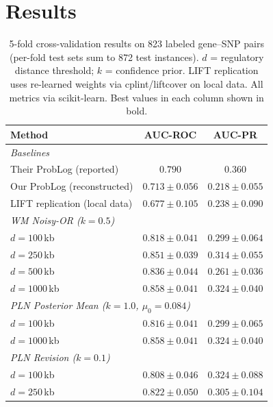\documentclass[]{article}
\begin{document}
\section{Results}
\label{sec:results}

\begin{table}[t]
\centering
\caption{5-fold cross-validation results on 823 labeled gene--SNP pairs
  (per-fold test sets sum to 872 test instances).
  $d$ = regulatory distance threshold; $k$ = confidence prior.
  LIFT replication uses re-learned weights via cplint/liftcover on local data.
  All metrics via scikit-learn.  Best values in each column shown in bold.}
\label{tab:results}
\begin{tabular}{@{}lcc@{}}
\toprule
\textbf{Method} & \textbf{AUC-ROC} & \textbf{AUC-PR} \\
\midrule
\multicolumn{3}{l}{\emph{Baselines}} \\
Their ProbLog (reported) & $0.790$ & $0.360$ \\
Our ProbLog (reconstructed) & $0.713 \pm 0.056$ & $0.218 \pm 0.055$ \\
LIFT replication (local data) & $0.677 \pm 0.105$ & $0.238 \pm 0.090$ \\
\midrule
\multicolumn{3}{l}{\emph{WM Noisy-OR ($k = 0.5$)}} \\
\quad $d = 100$\,kb & $0.818 \pm 0.041$ & $0.299 \pm 0.064$ \\
\quad $d = 250$\,kb & $0.851 \pm 0.039$ & $0.314 \pm 0.055$ \\
\quad $d = 500$\,kb & $0.836 \pm 0.044$ & $0.261 \pm 0.036$ \\
\quad $d = 1000$\,kb & $\mathbf{0.858 \pm 0.041}$ & $\mathbf{0.324 \pm 0.040}$ \\
\midrule
\multicolumn{3}{l}{\emph{PLN Posterior Mean ($k = 1.0$, $\mu_0 = 0.084$)}} \\
\quad $d = 100$\,kb & $0.816 \pm 0.041$ & $0.299 \pm 0.065$ \\
\quad $d = 1000$\,kb & $\mathbf{0.858 \pm 0.041}$ & $\mathbf{0.324 \pm 0.040}$ \\
\midrule
\multicolumn{3}{l}{\emph{PLN Revision ($k = 0.1$)}} \\
\quad $d = 100$\,kb & $0.808 \pm 0.046$ & $0.324 \pm 0.088$ \\
\quad $d = 250$\,kb & $0.822 \pm 0.050$ & $0.305 \pm 0.104$ \\
\bottomrule
\end{tabular}
\end{table}
\end{document}
